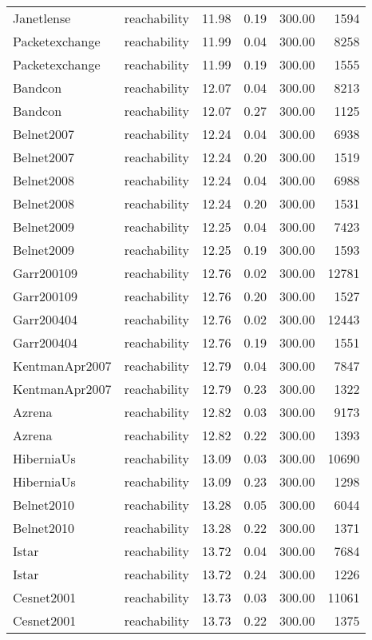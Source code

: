\begin{tabular}{llrrrr}
Janetlense & reachability & 11.98 & 0.19 & 300.00 & 1594 \\
Packetexchange & reachability & 11.99 & 0.04 & 300.00 & 8258 \\
Packetexchange & reachability & 11.99 & 0.19 & 300.00 & 1555 \\
Bandcon & reachability & 12.07 & 0.04 & 300.00 & 8213 \\
Bandcon & reachability & 12.07 & 0.27 & 300.00 & 1125 \\
Belnet2007 & reachability & 12.24 & 0.04 & 300.00 & 6938 \\
Belnet2007 & reachability & 12.24 & 0.20 & 300.00 & 1519 \\
Belnet2008 & reachability & 12.24 & 0.04 & 300.00 & 6988 \\
Belnet2008 & reachability & 12.24 & 0.20 & 300.00 & 1531 \\
Belnet2009 & reachability & 12.25 & 0.04 & 300.00 & 7423 \\
Belnet2009 & reachability & 12.25 & 0.19 & 300.00 & 1593 \\
Garr200109 & reachability & 12.76 & 0.02 & 300.00 & 12781 \\
Garr200109 & reachability & 12.76 & 0.20 & 300.00 & 1527 \\
Garr200404 & reachability & 12.76 & 0.02 & 300.00 & 12443 \\
Garr200404 & reachability & 12.76 & 0.19 & 300.00 & 1551 \\
KentmanApr2007 & reachability & 12.79 & 0.04 & 300.00 & 7847 \\
KentmanApr2007 & reachability & 12.79 & 0.23 & 300.00 & 1322 \\
Azrena & reachability & 12.82 & 0.03 & 300.00 & 9173 \\
Azrena & reachability & 12.82 & 0.22 & 300.00 & 1393 \\
HiberniaUs & reachability & 13.09 & 0.03 & 300.00 & 10690 \\
HiberniaUs & reachability & 13.09 & 0.23 & 300.00 & 1298 \\
Belnet2010 & reachability & 13.28 & 0.05 & 300.00 & 6044 \\
Belnet2010 & reachability & 13.28 & 0.22 & 300.00 & 1371 \\
Istar & reachability & 13.72 & 0.04 & 300.00 & 7684 \\
Istar & reachability & 13.72 & 0.24 & 300.00 & 1226 \\
Cesnet2001 & reachability & 13.73 & 0.03 & 300.00 & 11061 \\
Cesnet2001 & reachability & 13.73 & 0.22 & 300.00 & 1375 \\

\end{tabular}
